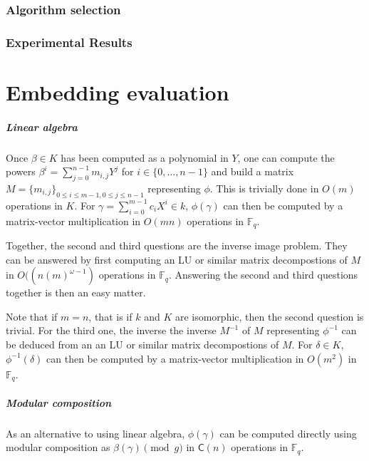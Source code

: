\documentclass[12pt]{article}
\theoremstyle{plain}
\theoremstyle{definition}
\def\F{\ensuremath{\mathbb{F}}}
\def\MC{\ensuremath{\mathsf{C}}}
\begin{document}
\section{Algorithm selection}
\label{sec:selection}

\section{Experimental Results}


\part{Embedding evaluation}
\label{part:eval}


\subsubsection{Linear algebra}

Once $\beta \in K$ has been computed as a polynomial in $Y$,
one can compute the powers
$\beta^i = \sum_{j=0}^{n-1} m_{i,j} Y^j$
for $i \in \{0, \ldots, n-1\}$ and build a matrix
$M = \{m_{i, j}\}_{0\leq i \leq m-1, 0 \leq j \leq n -1}$
representing $\phi$.
This is trivially done in $O(m)$ operations in $K$.
For $\gamma = \sum_{i = 0}^{m - 1} c_i X^i \in k$,
$\phi(\gamma)$ can then be computed by a
matrix-vector multiplication in $O(m n)$ operations in $\F_q$.

Together, the second and third questions are the inverse image problem.
They can be answered by first computing 
an LU or similar matrix decompostions of $M$
in $O((n (m)^{\omega - 1})$ operations in $\F_q$.
Answering the second and third questions together is then
an easy matter.

Note that if $m = n$, that is if $k$ and $K$ are
isomorphic, then the second question is trivial.
For the third one, the inverse
the inverse $M^{-1}$ of $M$ representing $\phi^{-1}$
can be deduced from an an LU or similar matrix decompostions of $M$.
For $\delta \in K$, $\phi^{-1}(\delta)$ can then be computed by a
matrix-vector multiplication in $O(m^2)$ in $\F_q$.

\subsubsection{Modular composition}

As an alternative to using linear algebra,
$\phi(\gamma)$ can be computed directly using modular composition
as $\beta(\gamma) \pmod{g}$ in $\MC(n)$ operations in $\F_q$.
\end{document}
